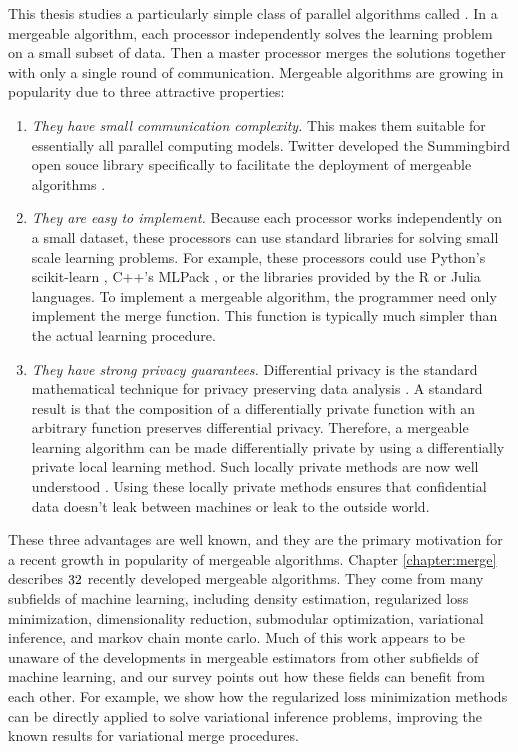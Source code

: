 \documentclass[thesis.tex]{subfiles}
\begin{document}
This thesis studies a particularly simple class of parallel algorithms called .
In a mergeable algorithm,
each processor independently solves the learning problem on a small subset of data.
Then a master processor merges the solutions together with only a single round of communication.
Mergeable algorithms are growing in popularity due to three attractive properties:
\begin{enumerate}
    \item
        \emph{They have small communication complexity.}
    This makes them suitable for essentially all parallel computing models.
    Twitter developed the Summingbird open souce library specifically to facilitate the deployment of mergeable algorithms \citep{boykin2014summingbird}.
    \item
        \emph{They are easy to implement. }
    Because each processor works independently on a small dataset,
    these processors can use standard libraries for solving small scale learning problems. 
    For example, these processors could use Python's scikit-learn \citep{scikit-learn},
    C++'s MLPack \citep{curtin2013mlpack},
    or the libraries provided by the R \citep{R} or Julia \citep{bezanson2017julia} languages.
    To implement a mergeable algorithm, the programmer need only implement the merge function.
    This function is typically much simpler than the actual learning procedure.
    \item
        \emph{They have strong privacy guarantees.}
    Differential privacy is the standard mathematical technique for privacy preserving data analysis \citep{dwork2014algorithmic}.
    A standard result is that the composition of a differentially private function with an arbitrary function preserves differential privacy. 
    Therefore, a mergeable learning algorithm can be made differentially private by using a differentially private local learning method.
    Such locally private methods are now well understood \citep{chaudhuri2011differentially}.
    Using these locally private methods ensures that confidential data doesn't leak between machines or leak to the outside world.
\end{enumerate}
These three advantages are well known,
and they are the primary motivation for a recent growth in popularity of mergeable algorithms.
Chapter \ref{chapter:merge} describes $32$ recently developed mergeable algorithms.
They come from many subfields of machine learning, including
density estimation, regularized loss minimization, dimensionality reduction, submodular optimization, variational inference, and markov chain monte carlo.
Much of this work appears to be unaware of the developments in mergeable estimators from other subfields of machine learning,
and our survey points out how these fields can benefit from each other.
For example, we show how the regularized loss minimization methods can be directly applied to solve variational inference problems,
improving the known results for variational merge procedures.
\end{document}
